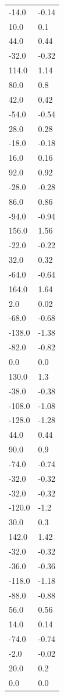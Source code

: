 \begin{longtable}{ll}
-14.0 & -0.14 \\
10.0 & 0.1 \\
44.0 & 0.44 \\
-32.0 & -0.32 \\
114.0 & 1.14 \\
80.0 & 0.8 \\
42.0 & 0.42 \\
-54.0 & -0.54 \\
28.0 & 0.28 \\
-18.0 & -0.18 \\
16.0 & 0.16 \\
92.0 & 0.92 \\
-28.0 & -0.28 \\
86.0 & 0.86 \\
-94.0 & -0.94 \\
156.0 & 1.56 \\
-22.0 & -0.22 \\
32.0 & 0.32 \\
-64.0 & -0.64 \\
164.0 & 1.64 \\
2.0 & 0.02 \\
-68.0 & -0.68 \\
-138.0 & -1.38 \\
-82.0 & -0.82 \\
0.0 & 0.0 \\
130.0 & 1.3 \\
-38.0 & -0.38 \\
-108.0 & -1.08 \\
-128.0 & -1.28 \\
44.0 & 0.44 \\
90.0 & 0.9 \\
-74.0 & -0.74 \\
-32.0 & -0.32 \\
-32.0 & -0.32 \\
-120.0 & -1.2 \\
30.0 & 0.3 \\
142.0 & 1.42 \\
-32.0 & -0.32 \\
-36.0 & -0.36 \\
-118.0 & -1.18 \\
-88.0 & -0.88 \\
56.0 & 0.56 \\
14.0 & 0.14 \\
-74.0 & -0.74 \\
-2.0 & -0.02 \\
20.0 & 0.2 \\
0.0 & 0.0 \\

\end{longtable}

